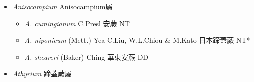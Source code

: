 
  \begin{itemize}
 \item[] \textit{Anisocampium} Anisocampium屬
                                
  \begin{itemize}
        \item[] \textit{A. cumingianum} C.Presl  安蕨   NT
        \item[] \textit{A. niponicum} (Mett.) Yea C.Liu, W.L.Chiou \& M.Kato  日本蹄蓋蕨   NT*
        \item[] \textit{A. sheareri} (Baker) Ching  華東安蕨   DD
  \end{itemize}
 \item[] \textit{Athyrium} 蹄蓋蕨屬
                                

\end{itemize}
